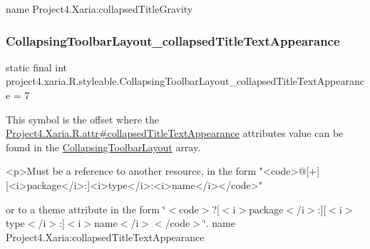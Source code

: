 name Project4.\+Xaria\+:collapsed\+Title\+Gravity \mbox{\label{classproject4_1_1xaria_1_1R_1_1styleable_a5d38cc3ee657b1c221bbd1c59349c1a8}} 
\subsubsection{\texorpdfstring{Collapsing\+Toolbar\+Layout\+\_\+collapsed\+Title\+Text\+Appearance}{CollapsingToolbarLayout\_collapsedTitleTextAppearance}}
{\footnotesize\ttfamily static final int project4.\+xaria.\+R.\+styleable.\+Collapsing\+Toolbar\+Layout\+\_\+collapsed\+Title\+Text\+Appearance = 7\hspace{0.3cm}{\ttfamily [static]}}

This symbol is the offset where the \hyperlink{}{Project4.\+Xaria.\+R.\+attr\#collapsed\+Title\+Text\+Appearance} attribute\textquotesingle{}s value can be found in the \hyperlink{classproject4_1_1xaria_1_1R_1_1styleable_ac131ed2b7e0e7f05b58231242478b839}{Collapsing\+Toolbar\+Layout} array.

\begin{DoxyVerb}      <p>Must be a reference to another resource, in the form "<code>@[+][<i>package</i>:]<i>type</i>:<i>name</i></code>"
\end{DoxyVerb}
 or to a theme attribute in the form \char`\"{}$<$code$>$?\mbox{[}$<$i$>$package$<$/i$>$\+:\mbox{]}\mbox{[}$<$i$>$type$<$/i$>$\+:\mbox{]}$<$i$>$name$<$/i$>$$<$/code$>$\char`\"{}.  name Project4.\+Xaria\+:collapsed\+Title\+Text\+Appearance \mbox{\label{classproject4_1_1xaria_1_1R_1_1styleable_aafc0ee2f0a373dd6bea4534c79ce24e2}} 

